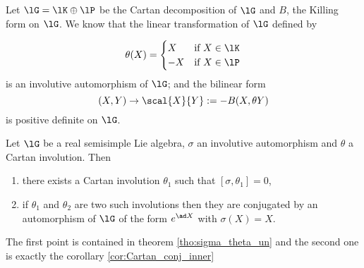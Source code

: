 Let $\lG=\lK\oplus\lP$ be the Cartan decomposition of $\lG$ and $B$, the Killing form on $\lG$. We know that the linear transformation of $\lG$ defined by
 
\[ 
 \theta(X)=\begin{cases}
             X & \text{if }X\in\lK\\
	     -X& \text{if }X\in\lP
           \end{cases}
\] 
 is an involutive automorphism of $\lG$; and the bilinear form
\[
  (X,Y)\to\scal{X}{Y}:=-B(X,\theta Y)
\]
is positive definite on $\lG$.

\begin{theorem}
Let $\lG$ be a real semisimple Lie algebra, $\sigma$ an involutive automorphism and $\theta$ a Cartan involution. Then

\begin{enumerate}
\item there exists a Cartan involution $\theta_1$ such that $[\sigma,\theta_1]=0$,
\item if $\theta_1$ and $\theta_2$ are two such involutions then they are conjugated by an automorphism of $\lG$ of the form $e^{\ad X}$ with $\sigma(X)=X$.
\end{enumerate}
\label{tho:sigma_theta}
\end{theorem}

The first point is contained in theorem \ref{tho:sigma_theta_un} and the second one is exactly the corollary \ref{cor:Cartan_conj_inner}




